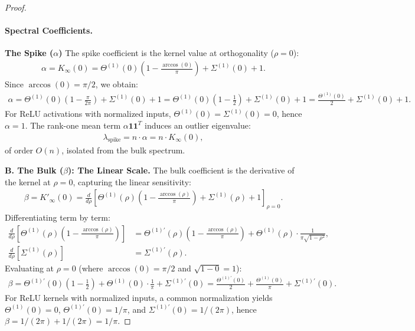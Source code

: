 \begin{proof}
\paragraph{Spectral Coefficients.}

\textbf{The Spike (\(\alpha\))}
The spike coefficient is the kernel value at orthogonality (\(\rho = 0\)):
\begin{align}
\alpha = K_\infty(0) = \Theta^{(1)}(0)\left(1 - \frac{\arccos(0)}{\pi}\right) + \Sigma^{(1)}(0) + 1.
\end{align}
Since \(\arccos(0) = \pi/2\), we obtain:
\begin{align}
\alpha = \Theta^{(1)}(0)\left(1 - \frac{\pi}{2\pi}\right) + \Sigma^{(1)}(0) + 1 = \Theta^{(1)}(0)\left(1 - \frac{1}{2}\right) + \Sigma^{(1)}(0) + 1 = \frac{\Theta^{(1)}(0)}{2} + \Sigma^{(1)}(0) + 1.
\end{align}
For ReLU activations with normalized inputs, \(\Theta^{(1)}(0) = \Sigma^{(1)}(0) = 0\), hence \(\alpha = 1\). The rank-one mean term \(\alpha \mathbf{1}\mathbf{1}^T\) induces an outlier eigenvalue:
\begin{align}
\lambda_{\mathrm{spike}} = n \cdot \alpha = n \cdot K_\infty(0),
\end{align}
of order \(O(n)\), isolated from the bulk spectrum.

\textbf{B. The Bulk (\(\beta\)): The Linear Scale.}
The bulk coefficient is the derivative of the kernel at \(\rho = 0\), capturing the linear sensitivity:
\begin{align}
\beta = K'_\infty(0) = \frac{d}{d\rho}\left[\Theta^{(1)}(\rho)\left(1 - \frac{\arccos(\rho)}{\pi}\right) + \Sigma^{(1)}(\rho) + 1\right]_{\rho=0}.
\end{align}
Differentiating term by term:
\begin{align*}
\frac{d}{d\rho}\left[\Theta^{(1)}(\rho)\left(1 - \frac{\arccos(\rho)}{\pi}\right)\right] &= \Theta^{(1)'}(\rho)\left(1 - \frac{\arccos(\rho)}{\pi}\right) + \Theta^{(1)}(\rho) \cdot \frac{1}{\pi\sqrt{1-\rho^2}}, \\
\frac{d}{d\rho}\left[\Sigma^{(1)}(\rho)\right] &= \Sigma^{(1)'}(\rho).
\end{align*}
Evaluating at \(\rho = 0\) (where \(\arccos(0) = \pi/2\) and \(\sqrt{1-0} = 1\)):
\begin{align}
\beta = \Theta^{(1)'}(0)\left(1 - \frac{1}{2}\right) + \Theta^{(1)}(0) \cdot \frac{1}{\pi} + \Sigma^{(1)'}(0) = \frac{\Theta^{(1)'}(0)}{2} + \frac{\Theta^{(1)}(0)}{\pi} + \Sigma^{(1)'}(0).
\end{align}
For ReLU kernels with normalized inputs, a common normalization yields \(\Theta^{(1)}(0) = 0\), \(\Theta^{(1)'}(0) = 1/\pi\), and \(\Sigma^{(1)'}(0) = 1/(2\pi)\), hence \(\beta = 1/(2\pi) + 1/(2\pi) = 1/\pi\).


\end{proof}
